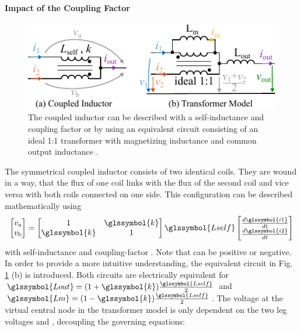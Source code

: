 \documentclass{IPEC2026}
\newcommand{\sbl}[1]{\glssymbol{#1}}
\begin{document}
\paragraph{Impact of the Coupling Factor}
\begin{figure}
  \includegraphics[width=0.9\columnwidth]{figures/Inkscape/Transformer-Model.pdf}
  \caption{The coupled inductor can be described with a self-inductance \sbl{Lself} and coupling factor \sbl{k} or by using an equivalent circuit consisting of an ideal 1:1 transformer with magnetizing inductance \sbl{Lm} and common output inductance \sbl{Lout}.}
  \label{fig:InductorModel}
\end{figure}
The symmetrical coupled inductor consists of two identical coils. They are wound in a way, that the flux of one coil links with the flux of the second coil and vice versa with both coils connected on one side. This configuration can be described mathematically using 
\begin{equation}
  \label{eq:StandardCoupling}
  \begin{bmatrix} v_\mathrm a \\ v_\mathrm b \end{bmatrix} = \begin{bmatrix} 1 & \sbl{k} \\ \sbl{k} & 1 \end{bmatrix} \sbl{Lself} \begin{bmatrix} \frac{d\sbl{i1}}{dt}  \\ \frac{d\sbl{i2}}{dt} \end{bmatrix}
\end{equation}
with self-inductance \sbl{Lself} and coupling-factor \sbl{k}. Note that \sbl{k} can be positive or negative.
In order to provide a more intuitive understanding, the equivalent circuit in Fig. \ref{fig:InductorModel} (b) is introduced. Both circuits are electrically equivalent for $\sbl{Lout} = (1+\sbl{k})\frac{\sbl{Lself}}{2}$ and $\sbl{Lm} = (1-\sbl{k})\frac{\sbl{Lself}}{2}$.
The voltage at the virtual central node in the transformer model is only dependent on the two leg voltages \sbl{v1} and \sbl{v2}, decoupling the governing equations:
\end{document}
